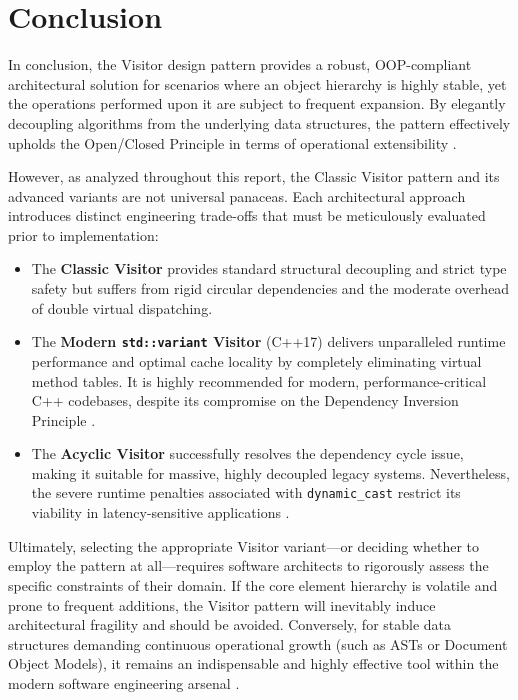 \section{Conclusion}
\label{sec:conclusion}

In conclusion, the Visitor design pattern provides a robust, OOP-compliant architectural solution for scenarios where an object hierarchy is highly stable, yet the operations performed upon it are subject to frequent expansion. By elegantly decoupling algorithms from the underlying data structures, the pattern effectively upholds the Open/Closed Principle in terms of operational extensibility \cite{gof1994}.

However, as analyzed throughout this report, the Classic Visitor pattern and its advanced variants are not universal panaceas. Each architectural approach introduces distinct engineering trade-offs that must be meticulously evaluated prior to implementation:

\begin{itemize}
    \item The \textbf{Classic Visitor} provides standard structural decoupling and strict type safety but suffers from rigid circular dependencies and the moderate overhead of double virtual dispatching.
    \item The \textbf{Modern \texttt{std::variant} Visitor} (C++17) delivers unparalleled runtime performance and optimal cache locality by completely eliminating virtual method tables. It is highly recommended for modern, performance-critical C++ codebases, despite its compromise on the Dependency Inversion Principle \cite{cpprefvariant,cpprefvisit}.
    \item The \textbf{Acyclic Visitor} successfully resolves the dependency cycle issue, making it suitable for massive, highly decoupled legacy systems. Nevertheless, the severe runtime penalties associated with \texttt{dynamic\_cast} restrict its viability in latency-sensitive applications \cite{martin1997,cpprefrtti}.
\end{itemize}

Ultimately, selecting the appropriate Visitor variant—or deciding whether to employ the pattern at all—requires software architects to rigorously assess the specific constraints of their domain. If the core element hierarchy is volatile and prone to frequent additions, the Visitor pattern will inevitably induce architectural fragility and should be avoided. Conversely, for stable data structures demanding continuous operational growth (such as ASTs or Document Object Models), it remains an indispensable and highly effective tool within the modern software engineering arsenal \cite{gof1994}.
